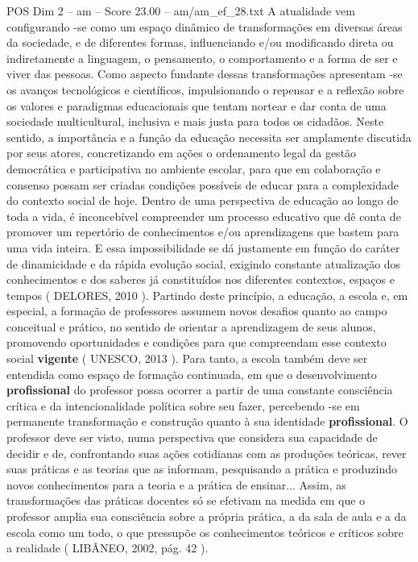 \begin{textsample}{POS Dim 2 – am – Score 23.00 – am/am\_ef\_28.txt}  \label{ex:f2_pos_156}
A atualidade vem configurando -se como um espaço dinâmico de transformações em diversas áreas da sociedade, e de diferentes formas, influenciando e/ou modificando direta ou indiretamente a linguagem, o pensamento, o comportamento e a forma de ser e viver das pessoas.
Como aspecto fundante dessas transformações apresentam -se os avanços tecnológicos e científicos, impulsionando o repensar e a reflexão sobre os valores e paradigmas educacionais que tentam nortear e dar conta de uma sociedade multicultural, inclusiva e mais justa para todos os cidadãos.
Neste sentido, a importância e a função da educação necessita ser amplamente discutida por seus atores, concretizando em ações o ordenamento legal da gestão democrática e participativa no ambiente escolar, para que em colaboração e consenso possam ser criadas condições possíveis de educar para a complexidade do contexto social de hoje.
Dentro de uma perspectiva de educação ao longo de toda a vida, é inconcebível compreender um processo educativo que dê conta de promover um repertório de conhecimentos e/ou aprendizagens que bastem para uma vida inteira.
E essa impossibilidade se dá justamente em função do caráter de dinamicidade e da rápida evolução social, exigindo constante atualização dos conhecimentos e dos saberes já constituídos nos diferentes contextos, espaços e tempos ( DELORES, 2010 ).
Partindo deste princípio, a educação, a escola e, em especial, a formação de professores assumem novos desafios quanto ao campo conceitual e prático, no sentido de orientar a aprendizagem de seus alunos, promovendo oportunidades e condições para que compreendam esse contexto social \textbf{vigente} ( UNESCO, 2013 ).
Para tanto, a escola também deve ser entendida como espaço de formação continuada, em que o desenvolvimento \textbf{profissional} do professor possa ocorrer a partir de uma constante consciência crítica e da intencionalidade política sobre seu fazer, percebendo -se em permanente transformação e construção quanto à sua identidade \textbf{profissional}.
O professor deve ser visto, numa perspectiva que considera sua capacidade de decidir e de, confrontando suas ações cotidianas com as produções teóricas, rever suas práticas e as teorias que as informam, pesquisando a prática e produzindo novos conhecimentos para a teoria e a prática de ensinar...
Assim, as transformações das práticas docentes só se efetivam na medida em que o professor amplia sua consciência sobre a própria prática, a da sala de aula e a da escola como um todo, o que pressupõe os conhecimentos teóricos e críticos sobre a realidade ( LIBÂNEO, 2002, pág. 42 ).

\end{textsample}
